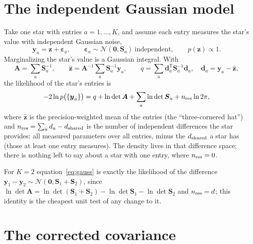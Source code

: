 \documentclass[11pt,a4paper]{article}
\newcommand{\bv}[1]{\boldsymbol{#1}}          %
\newcommand{\bM}[1]{\boldsymbol{#1}}          %
\newcommand{\T}{^{\mathsf T}}
\newcommand{\lndet}{\ln\det}
\newcommand{\N}{\mathcal{N}}
\begin{document}
\section{The independent Gaussian model}
\label{sec:gauss}

Take one star with entries $a = 1,\dots,K$, and assume each entry measures the
star's value with independent Gaussian noise,
\begin{equation}
  \bv y_a = \bv z + \bv\varepsilon_a, \qquad
  \bv\varepsilon_a \sim \N(\bv 0, \bM S_a) \ \text{independent},
  \qquad p(\bv z) \propto 1 .
\end{equation}
Marginalizing the star's value is a Gaussian integral. With
\begin{equation}
  \bM A = \sum_{a} \bM S_a^{-1}, \qquad
  \hat{\bv z} = \bM A^{-1}\sum_a \bM S_a^{-1}\bv y_a, \qquad
  q = \sum_a \bv d_a\T \bM S_a^{-1}\bv d_a, \quad \bv d_a = \bv y_a - \hat{\bv z},
\end{equation}
the likelihood of the star's entries is
\begin{equation}
  -2\ln p\big(\{\bv y_a\}\big)
  = q + \lndet\bM A + \sum_a \lndet \bM S_a + n_{\rm res}\ln 2\pi ,
  \label{eq:gauss}
\end{equation}
where $\hat{\bv z}$ is the precision-weighted mean of the entries (the
``three-cornered hat'') and $n_{\rm res} = \sum_a d_a - d_{\rm shared}$ is the
number of independent differences the star provides: all measured parameters
over all entries, minus the $d_{\rm shared}$ a star has (those at least one
entry measures). The density lives in that difference space; there is nothing
left to say about a star with one entry, where $n_{\rm res}=0$.

For $K=2$ equation~\eqref{eq:gauss} is exactly the likelihood of the difference
$\bv y_1-\bv y_2 \sim \N(\bv 0, \bM S_1+\bM S_2)$, since
$\lndet\bM A = \lndet(\bM S_1+\bM S_2) - \lndet\bM S_1 - \lndet\bM S_2$ and
$n_{\rm res}=d$; this identity is the cheapest unit test of any change to it.

\section{The corrected covariance}
\label{sec:cov}
\end{document}

